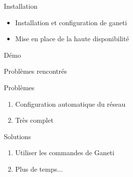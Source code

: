\begin{frame}{Installation}
\begin{itemize}
\item Installation et configuration de ganeti
\pause
\item Mise en place de la haute disponibilité
\end{itemize}
\end{frame}


\begin{frame}
  \begin{center}
   \huge{Démo}
  \end{center}
\end{frame}

\begin{frame}{Problèmes rencontrés}
 \begin{alertblock}{Problèmes}
   \begin{enumerate}
     \item Configuration automatique du réseau
     \item Très complet
       \pause
   \end{enumerate}
 \end{alertblock}
\pause
 \begin{exampleblock}{Solutions}
   \begin{enumerate}
     \item Utiliser les commandes de Ganeti
     \item Plus de temps...
   \end{enumerate}
 \end{exampleblock}
\end{frame}



%
